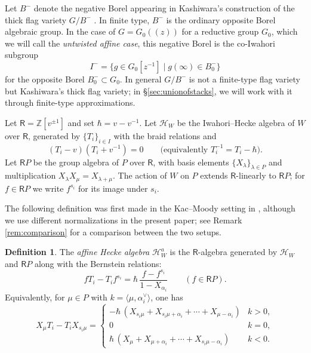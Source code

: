 \documentclass{amsart}
\newcommand{\Hecke}{\mathcal{H}}
\newcommand{\Ring}{\mathsf{R}}
\newcommand{\Ha}{\mathcal{H}_{W}^a}
\theoremstyle{definition}
\newtheorem{defi}[Thm]{Definition}
\numberwithin{equation}{section}
\begin{document}
Let $B^-$ denote the negative Borel appearing in Kashiwara's construction of the
thick flag variety $G/B^-$ \cite[\S 5]{K}.
In finite type, $B^-$ is the ordinary opposite Borel
algebraic group. In the case of $G=G_0(\!(z)\!)$ for a reductive group
$G_0$, which we will call the \emph{untwisted affine case}, this negative
Borel is the co-Iwahori subgroup
\[I^-=\{g\in G_0[z^{-1}]\mid g(\infty)\in B_0^-\}\]
for the opposite Borel $B_0^- \subset G_0$. In general \(G/B^-\) is not a finite-type flag variety but Kashiwara's thick
flag variety; in \S\ref{sec:unionofstacks}, we will work with it through
finite-type approximations.

Let $\Ring=\mathbb Z[v^{\pm 1}]$ and set $\hbar=v-v^{-1}$.
Let $\Hecke_W$ be the Iwahori--Hecke algebra of $W$ over $\Ring$,
generated by $\{T_i\}_{i\in I}$ with the braid relations and
\begin{equation}\label{eq:hecke_quadratic}
(T_i-v)(T_i+v^{-1})=0 \qquad\text{(equivalently }T_i^{-1}=T_i-\hbar\text{)}.
\end{equation}
Let $\Ring P$ be the group algebra of $P$ over $\Ring$, with basis elements
$\{X_\lambda\}_{\lambda\in P}$ and multiplication $X_\lambda X_\mu=X_{\lambda+\mu}$.
The action of $W$ on $P$ extends $\Ring$-linearly to $\Ring P$; for $f\in \Ring P$ we
write $f^{s_i}$ for its image under $s_i$.

The following definition was first made in the Kac--Moody setting in \cite{GG}, although we use different normalizations in the present paper; see Remark \ref{rem:comparison} for a comparison between the two setups.
\begin{defi}\label{def:affine-hecke}
The \emph{affine Hecke algebra} $\Ha$ is the $\Ring$-algebra generated by
$\Hecke_W$ and $\Ring P$ along with the Bernstein relations:
\begin{equation}\label{eq:Bernstein_general}
fT_i-T_i f^{s_i}=\hbar\,\frac{f-f^{s_i}}{1-X_{\alpha_i}}
\qquad (f\in \Ring P).
\end{equation}
Equivalently, for $\mu\in P$ with $k=\langle \mu,\alpha_i^\vee\rangle$, one has
\begin{equation}
\label{eq:Bernstein_alternative}
X_\mu T_i - T_i X_{s_i\mu}
=
\begin{cases}
-\hbar\,(X_{s_i\mu}+ X_{s_i\mu+\alpha_i}+ \cdots + X_{\mu-\alpha_i}) & k>0,\\[2pt]
0 & k=0,\\[2pt]
\hbar\,(X_{\mu}+ X_{\mu+\alpha_i}+ \cdots + X_{s_i\mu-\alpha_i}) & k<0.
\end{cases}
\end{equation}
\end{defi}
\end{document}
